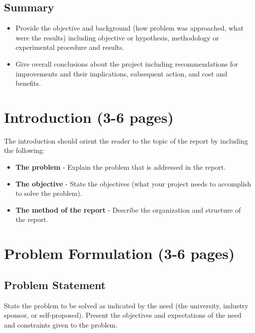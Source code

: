 \documentclass[12pt]{article}
\begin{document}
\subsection*{Summary}
\begin{itemize}[noitemsep]
    \item Provide the objective and background (how problem was approached, what were the results) including objective or hypothesis, methodology or experimental procedure and results.
    \item Give overall conclusions about the project including recommendations for improvements and their implications, subsequent action, and cost and benefits.
\end{itemize}

\tableofcontents
\newpage

\section{Introduction (3-6 pages)}
The introduction should orient the reader to the topic of the report by including the following:
\begin{itemize}[noitemsep]
    \item \textbf{The problem} - Explain the problem that is addressed in the report.
    \item \textbf{The objective} - State the objectives (what your project needs to accomplish to solve the problem).
    \item \textbf{The method of the report} - Describe the organization and structure of the report.
\end{itemize}

\section{Problem Formulation (3-6 pages)}
\subsection{Problem Statement}
State the problem to be solved as indicated by the need (the university, industry sponsor, or self-proposed). Present the objectives and expectations of the need and constraints given to the problem.
\end{document}
